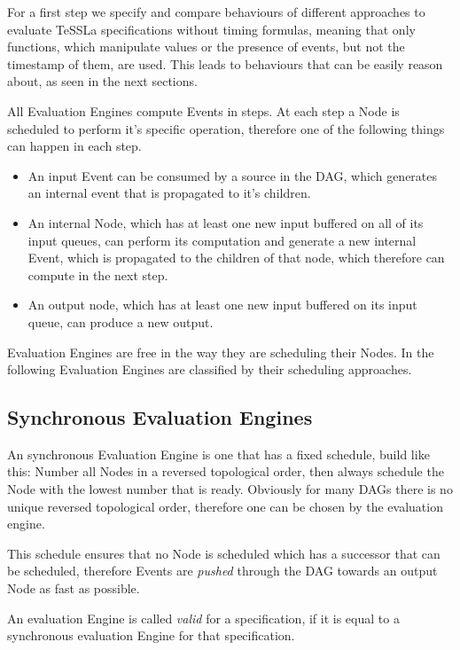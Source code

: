 For a first step we specify and compare behaviours of different approaches to evaluate TeSSLa specifications without timing formulas,
meaning that only functions, which manipulate values or the presence of events, but not the timestamp of them, are used.
This leads to behaviours that can be easily reason about, as seen in the next sections.

All Evaluation Engines compute Events in steps.
At each step a Node is scheduled to perform it's specific operation, therefore one of the following things can happen in each step.

\begin{itemize}
  \item An input Event can be consumed by a source in the DAG, which generates an internal event that is propagated to it's children.
  \item An internal Node, which has at least one new input buffered on all of its input queues, can perform
    its computation and generate a new internal Event, which is propagated to the children of that node, which therefore can compute in the next step.
  \item An output node, which has at least one new input buffered on its input queue, can produce a new output.
\end{itemize}

Evaluation Engines are free in the way they are scheduling their Nodes.
In the following Evaluation Engines are classified by their scheduling approaches.

\subsection{Synchronous Evaluation Engines}
\label{sec:concepts:behaviour_without_timing:synchronous}

An synchronous Evaluation Engine is one that has a fixed schedule, build like this:
Number all Nodes in a reversed topological order, then always schedule the Node with the lowest number that is ready.
Obviously for many DAGs there is no unique reversed topological order, therefore one can be chosen by the evaluation engine.

This schedule ensures that no Node is scheduled which has a successor that can be scheduled, therefore Events are \emph{pushed} through the DAG towards an output Node as fast as possible.

\begin{definition}
  An evaluation Engine is called \emph{valid} for a specification, if it is equal to a synchronous evaluation Engine for that specification.
\label{def:valid_eval_engine}
\end{definition}

